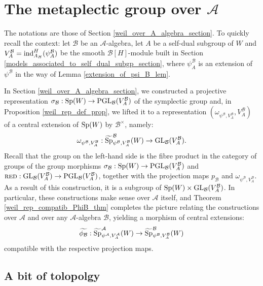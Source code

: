 \documentclass[11pt]{article}
\theoremstyle{plain}
\theoremstyle{definition}
\theoremstyle{plain}
\theoremstyle{definition}
\theoremstyle{plain}
\begin{document}
\section{The metaplectic group over $\mathcal{A}$}

The notations are those of Section \ref{weil_over_A_algebra_section}. To quickly recall the context: let $\mathcal{B}$ be an $\mathcal{A}$-algebra, let $A$ be a self-dual subgroup of $W$ and $V_A^\mathcal{B}=\textup{ind}_{A_H}^H(\psi_A^\mathcal{B})$ be the smooth $\mathcal{B}[H]$-module built in Section \ref{models_associated_to_self_dual_subgp_section}, where $\psi_A^\mathcal{B}$ is an extension of $\psi^\mathcal{B}$ in the way of Lemma \ref{extension_of_psi_B_lem}.

In Section \ref{weil_over_A_algebra_section}, we constructed a projective representation $\sigma_\mathcal{B} : \textup{Sp}(W) \to  \textup{PGL}_\mathcal{B}(V_A^\mathcal{B})$ of the symplectic group and, in Proposition \ref{weil_rep_def_prop}, we lifted it to a representation $(\omega_{\psi^\mathcal{B},V_A^\mathcal{B}},V_A^\mathcal{B})$ of a central extension of $\textup{Sp}(W)$ by $\mathcal{B}^\times$, namely:
$$\omega_{\psi^\mathcal{B},V_A^\mathcal{B}} : \widetilde{\textup{Sp}}_{\psi^\mathcal{B},V_A^\mathcal{B}}^\mathcal{B}(W) \to \textup{GL}_\mathcal{B}(V_A^\mathcal{B}).$$
Recall that the group on the left-hand side is the fibre product in the category of groups of the group morphisms $\sigma_\mathcal{B} : \textup{Sp}(W) \to \textup{PGL}_\mathcal{B}(V_A^\mathcal{B})$ and $\textup{\textsc{red}} : \textup{GL}_\mathcal{B}(V_A^\mathcal{B}) \to \textup{PGL}_\mathcal{B}(V_A^\mathcal{B})$, together with the projection maps $p_\mathcal{B}$ and $\omega_{\psi^\mathcal{B},V_A^\mathcal{B}}$. As a result of this construction, it is a subgroup of $\textup{Sp}(W) \times  \textup{GL}_\mathcal{B}(V_A^\mathcal{B})$. In particular, these constructions make sense over $\mathcal{A}$ itself, and Theorem \ref{weil_rep_compatib_PhiB_thm} completes the picture relating the constructions over $\mathcal{A}$ and over any $\mathcal{A}$-algebra $\mathcal{B}$, yielding a morphism of central extensions:
$$\widetilde{\phi_\mathcal{B}} :  \widetilde{\textup{Sp}}_{\psi^\mathcal{A},V_A^\mathcal{A}}^\mathcal{A}(W) \to \widetilde{\textup{Sp}}_{\psi^\mathcal{B},V_A^\mathcal{B}}^\mathcal{B}(W)$$
compatible with the respective projection maps.


\subsection{A bit of tolopolgy} \label{a_bit_of_top_section}
\end{document}
